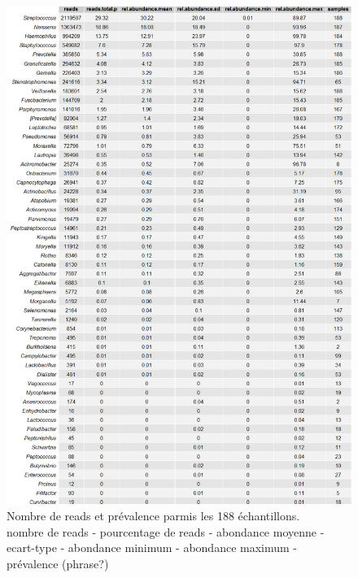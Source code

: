 \documentclass[12pt,a4paper]{article}
\begin{document}
\begin{figure}
\begin{center}
\includegraphics[scale=0.5]{img/all_table.png}\hfill
\end{center}
\caption{Nombre de reads et prévalence parmis les 188 échantillons.\\ nombre de reads - pourcentage de reads - abondance moyenne - ecart-type - abondance minimum - abondance maximum - prévalence (phrase?)}
\label{alltable}
\end{figure}
\end{document}
